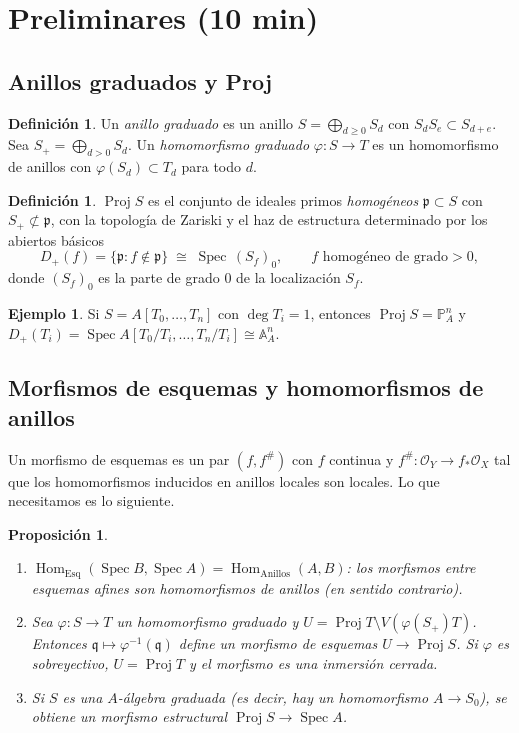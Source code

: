 \documentclass[11pt,a4paper]{article}
\newcommand{\Spec}{\operatorname{Spec}}
\newcommand{\Proj}{\operatorname{Proj}}
\newcommand{\A}{\mathbb{A}}
\newcommand{\PP}{\mathbb{P}}
\newcommand{\cO}{\mathcal{O}}
\theoremstyle{plain}
\newtheorem{proposicion}[teorema]{Proposición}
\theoremstyle{definition}
\newtheorem{definicion}[teorema]{Definición}
\newtheorem{ejemplo}[teorema]{Ejemplo}
\theoremstyle{remark}
\begin{document}
\section{Preliminares (10 min)}

\subsection{Anillos graduados y Proj}

\begin{definicion}
Un \emph{anillo graduado} es un anillo $S=\bigoplus_{d\ge 0}S_d$ con $S_dS_e\subset S_{d+e}$. Sea $S_+=\bigoplus_{d>0}S_d$. Un \emph{homomorfismo graduado} $\varphi\colon S\to T$ es un homomorfismo de anillos con $\varphi(S_d)\subset T_d$ para todo $d$.
\end{definicion}

\begin{definicion}
$\Proj S$ es el conjunto de ideales primos \emph{homogéneos} $\mathfrak p\subset S$ con $S_+\not\subset\mathfrak p$, con la topología de Zariski y el haz de estructura determinado por los abiertos básicos
\[
D_+(f)=\{\mathfrak p : f\notin\mathfrak p\}\;\cong\;\Spec\,(S_f)_0,\qquad f \text{ homogéneo de grado}>0,
\]
donde $(S_f)_0$ es la parte de grado $0$ de la localización $S_f$.
\end{definicion}

\begin{ejemplo}\label{ej:Pn}
Si $S=A[T_0,\dots,T_n]$ con $\deg T_i=1$, entonces $\Proj S=\PP^n_A$ y $D_+(T_i)=\Spec A[T_0/T_i,\dots,T_n/T_i]\cong\A^n_A$.
\end{ejemplo}

\subsection{Morfismos de esquemas y homomorfismos de anillos}

Un morfismo de esquemas es un par $(f,f^\#)$ con $f$ continua y $f^\#\colon\cO_Y\to f_*\cO_X$ tal que los homomorfismos inducidos en anillos locales son locales. Lo que necesitamos es lo siguiente.

\begin{proposicion}\label{prop:homo-morf}
\begin{enumerate}[label=(\alph*)]
\item $\operatorname{Hom}_{\mathrm{Esq}}(\Spec B,\Spec A)=\operatorname{Hom}_{\mathrm{Anillos}}(A,B)$: los morfismos entre esquemas afines \emph{son} homomorfismos de anillos (en sentido contrario).
\item Sea $\varphi\colon S\to T$ un homomorfismo graduado y $U=\Proj T\setminus V(\varphi(S_+)T)$. Entonces $\mathfrak q\mapsto\varphi^{-1}(\mathfrak q)$ define un morfismo de esquemas $U\to\Proj S$. Si $\varphi$ es sobreyectivo, $U=\Proj T$ y el morfismo es una inmersión cerrada.
\item Si $S$ es una $A$-álgebra graduada (es decir, hay un homomorfismo $A\to S_0$), se obtiene un morfismo estructural $\Proj S\to\Spec A$.
\end{enumerate}
\end{proposicion}
\end{document}
